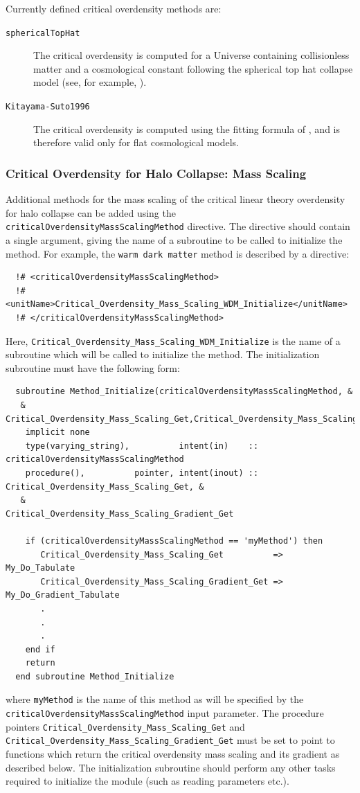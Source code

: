 Currently defined critical overdensity methods are:
\begin{description}
 \item [{\tt sphericalTopHat}] The critical overdensity is computed for a Universe containing collisionless matter and a cosmological constant following the spherical top hat collapse model (see, for example, \citealt{percival_cosmological_2005}).
 \item [{\tt Kitayama-Suto1996}] The critical overdensity is computed using the fitting formula of \cite{kitayama_semianalytic_1996}, and is therefore valid only for flat cosmological models.
\end{description}

\subsubsection{Critical Overdensity for Halo Collapse: Mass Scaling}

Additional methods for the mass scaling of the critical linear theory overdensity for halo collapse can be added using the {\tt criticalOverdensityMassScalingMethod} directive. The directive should contain a single argument, giving the name of a subroutine to be called to initialize the method. For example, the {\tt warm dark matter} method is described by a directive:
\begin{verbatim}
  !# <criticalOverdensityMassScalingMethod>
  !#  <unitName>Critical_Overdensity_Mass_Scaling_WDM_Initialize</unitName>
  !# </criticalOverdensityMassScalingMethod>
\end{verbatim}
Here, {\tt Critical\_Overdensity\_Mass\_Scaling\_WDM\_Initialize} is the name of a subroutine which will be called to initialize the method. The initialization subroutine must have the following form:
\begin{verbatim}
  subroutine Method_Initialize(criticalOverdensityMassScalingMethod, &
   & Critical_Overdensity_Mass_Scaling_Get,Critical_Overdensity_Mass_Scaling_Gradient_Get)
    implicit none
    type(varying_string),          intent(in)    :: criticalOverdensityMassScalingMethod
    procedure(),          pointer, intent(inout) :: Critical_Overdensity_Mass_Scaling_Get, &
   &                                                Critical_Overdensity_Mass_Scaling_Gradient_Get
    
    if (criticalOverdensityMassScalingMethod == 'myMethod') then
       Critical_Overdensity_Mass_Scaling_Get          => My_Do_Tabulate
       Critical_Overdensity_Mass_Scaling_Gradient_Get => My_Do_Gradient_Tabulate
       .
       .
       .
    end if
    return
  end subroutine Method_Initialize
\end{verbatim}
where {\tt myMethod} is the name of this method as will be specified by the {\tt criticalOverdensityMassScalingMethod} input parameter. The procedure pointers {\tt Critical\_Overdensity\_Mass\_Scaling\_Get} and {\tt Critical\_Overdensity\_Mass\_Scaling\_Gradient\_Get} must be set to point to functions which return the critical overdensity mass scaling and its gradient as described below. The initialization subroutine should perform any other tasks required to initialize the module (such as reading parameters etc.).

